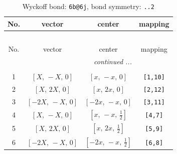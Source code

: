 \documentclass[fleqn,8pt]{jsarticle}
\begin{document}
\begin{longtable}{cccc}
\caption{Wyckoff bond: {\tt 6b@6j}, bond symmetry: {\tt ..2}}
 \\
 \hline \hline
No. & vector & center & mapping \\ \hline \endfirsthead

\multicolumn{3}{l}{\tablename\ \thetable{}} \\
 \hline \hline
No. & vector & center & mapping \\ \hline \endhead

 \hline \hline
\multicolumn{3}{r}{\footnotesize\it continued ...} \\ \endfoot

 \hline \hline
\multicolumn{3}{r}{} \\ \endlastfoot

1 & $\left[ X,\, - X,\, 0 \right]$ & $\left[ x,\, - x,\, 0 \right]$ & {\tt [1,10]} \\ \hline
2 & $\left[ X,\, 2 X,\, 0 \right]$ & $\left[ x,\, 2 x,\, 0 \right]$ & {\tt [2,12]} \\ \hline
3 & $\left[ - 2 X,\, - X,\, 0 \right]$ & $\left[ - 2 x,\, - x,\, 0 \right]$ & {\tt [3,11]} \\ \hline
4 & $\left[ X,\, - X,\, 0 \right]$ & $\left[ x,\, - x,\, \frac{1}{2} \right]$ & {\tt [4,7]} \\ \hline
5 & $\left[ X,\, 2 X,\, 0 \right]$ & $\left[ x,\, 2 x,\, \frac{1}{2} \right]$ & {\tt [5,9]} \\ \hline
6 & $\left[ - 2 X,\, - X,\, 0 \right]$ & $\left[ - 2 x,\, - x,\, \frac{1}{2} \right]$ & {\tt [6,8]} \\
\end{longtable}
\renewcommand{\arraystretch}{1.2}
\end{document}
